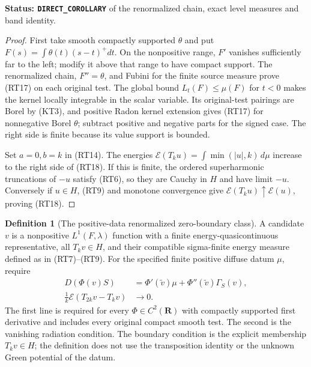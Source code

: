 \documentclass[11pt,a4paper]{article}
\numberwithin{equation}{section}
\theoremstyle{definition}
\newtheorem{definition}[theorem]{Definition}
\theoremstyle{remark}
\begin{document}
\noindent\textbf{Status: \texttt{DIRECT\_COROLLARY}} of the
renormalized chain, exact level measures and band identity.

\begin{proof}
First take smooth compactly supported $\theta$ and put
$F(s)=\int\theta(t)(s-t)^+dt$.
On the nonpositive range, $F'$ vanishes sufficiently far to
the left; modify it above that range to have compact support.
The renormalized chain, $F''=\theta$, and Fubini for the
finite source measure prove (RT17) on each original test.
The global bound $L_t(F)\le\mu(F)$ for $t<0$ makes the kernel
locally integrable in the scalar variable.  Its original-test
pairings are Borel by (KT3), and positive Radon kernel
extension gives (RT17) for nonnegative Borel $\theta$;
subtract positive and negative parts for the signed case.
The right side is finite because its value support is bounded.

Set $a=0,b=k$ in (RT14).  The energies
$\mathcal E(T_ku)=\int\min(|u|,k)\,d\mu$ increase to the
right side of (RT18).  If this is finite, the ordered
superharmonic truncations of $-u$ satisfy (RT6), so they
are Cauchy in $H$ and have limit $-u$.  Conversely if $u\in H$,
(RT9) and monotone convergence give
$\mathcal E(T_ku)\uparrow\mathcal E(u)$, proving (RT18).
\end{proof}

\begin{definition}[The positive-data renormalized zero-boundary class]
\label{def:r11-renormalized-positive-boundary}
A candidate $v$ is a nonpositive $L^1(F,\lambda)$ function with
a finite energy-quasicontinuous representative, all $T_kv\in H$,
and their compatible sigma-finite energy measure defined as
in (RT7)--(RT9).  For the specified finite positive diffuse datum
$\mu$, require
\[
 \begin{split}
 D(\Phi(v)S)&=\Phi'(\widetilde v)\mu
                         +\Phi''(\widetilde v)\Gamma_S(v)
,\\
 \frac{1}{k}\mathcal E(T_{2k}v-T_kv)&\longrightarrow0.
 \end{split}
 \tag{RT19}
\]
The first line is required for every $\Phi\in C^2(\mathbf R)$
with compactly supported first derivative and includes every
original compact smooth test.  The second is the vanishing
radiation condition.  The boundary
condition is the explicit membership $T_kv\in H$; the definition
does not use the transposition identity or the unknown Green
potential of the datum.
\end{definition}
\end{document}
